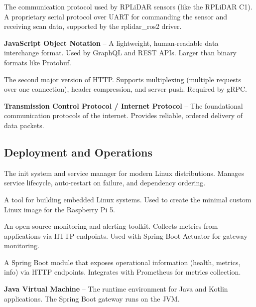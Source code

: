\begin{description}[style=nextline, leftmargin=2cm]
    \item[SLAMTEC Protocol] The communication protocol used by RPLiDAR sensors (like the RPLiDAR C1). A proprietary serial protocol over UART for commanding the sensor and receiving scan data, supported by the rplidar\_ros2 driver.

    \item[JSON] \textbf{JavaScript Object Notation} -- A lightweight, human-readable data interchange format. Used by GraphQL and REST APIs. Larger than binary formats like Protobuf.

    \item[HTTP/2] The second major version of HTTP. Supports multiplexing (multiple requests over one connection), header compression, and server push. Required by gRPC.

    \item[TCP/IP] \textbf{Transmission Control Protocol / Internet Protocol} -- The foundational communication protocols of the internet. Provides reliable, ordered delivery of data packets.
\end{description}

\subsection{Deployment and Operations}

\begin{description}[style=nextline, leftmargin=2cm]
    \item[systemd] The init system and service manager for modern Linux distributions. Manages service lifecycle, auto-restart on failure, and dependency ordering.

    \item[Buildroot] A tool for building embedded Linux systems. Used to create the minimal custom Linux image for the Raspberry Pi 5.

    \item[Prometheus] An open-source monitoring and alerting toolkit. Collects metrics from applications via HTTP endpoints. Used with Spring Boot Actuator for gateway monitoring.

    \item[Actuator] A Spring Boot module that exposes operational information (health, metrics, info) via HTTP endpoints. Integrates with Prometheus for metrics collection.

    \item[JVM] \textbf{Java Virtual Machine} -- The runtime environment for Java and Kotlin applications. The Spring Boot gateway runs on the JVM.
\end{description}
